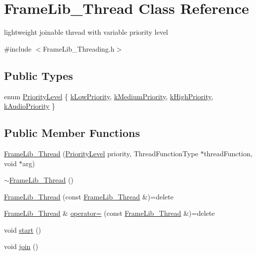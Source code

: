 \hypertarget{class_frame_lib___thread}{}\section{Frame\+Lib\+\_\+\+Thread Class Reference}
\label{class_frame_lib___thread}


lightweight joinable thread with variable priority level  




{\ttfamily \#include $<$Frame\+Lib\+\_\+\+Threading.\+h$>$}

\subsection*{Public Types}
\begin{DoxyCompactItemize}
\item 
enum \hyperlink{class_frame_lib___thread_a99a5e56edcadf37e3388f5557e8ec7ed}{Priority\+Level} \{ \hyperlink{class_frame_lib___thread_a99a5e56edcadf37e3388f5557e8ec7eda1a88fab67841ce6becd6f20038414626}{k\+Low\+Priority}, 
\hyperlink{class_frame_lib___thread_a99a5e56edcadf37e3388f5557e8ec7eda2636ca3f19213ed53440fb07a1b74fda}{k\+Medium\+Priority}, 
\hyperlink{class_frame_lib___thread_a99a5e56edcadf37e3388f5557e8ec7eda0094300f409c6599b652d503f8a66d77}{k\+High\+Priority}, 
\hyperlink{class_frame_lib___thread_a99a5e56edcadf37e3388f5557e8ec7edab5c5b4bbe028d4f9d4d605d79fb97895}{k\+Audio\+Priority}
 \}
\end{DoxyCompactItemize}
\subsection*{Public Member Functions}
\begin{DoxyCompactItemize}
\item 
\hyperlink{class_frame_lib___thread_a021c5dfa5ac08a22020680bd57ba575d}{Frame\+Lib\+\_\+\+Thread} (\hyperlink{class_frame_lib___thread_a99a5e56edcadf37e3388f5557e8ec7ed}{Priority\+Level} priority, Thread\+Function\+Type $\ast$thread\+Function, void $\ast$arg)
\item 
\hyperlink{class_frame_lib___thread_a3131c05e77de52925145496a8a7d0bb1}{$\sim$\+Frame\+Lib\+\_\+\+Thread} ()
\item 
\hyperlink{class_frame_lib___thread_a0c371ea3c0cf803ffc568fcb28d0a41a}{Frame\+Lib\+\_\+\+Thread} (const \hyperlink{class_frame_lib___thread}{Frame\+Lib\+\_\+\+Thread} \&)=delete
\item 
\hyperlink{class_frame_lib___thread}{Frame\+Lib\+\_\+\+Thread} \& \hyperlink{class_frame_lib___thread_af6a6b8a2ae2b38eb9629871ef3c40e01}{operator=} (const \hyperlink{class_frame_lib___thread}{Frame\+Lib\+\_\+\+Thread} \&)=delete
\item 
void \hyperlink{class_frame_lib___thread_a5b6dbb96372355e02fb81753638b6102}{start} ()
\item 
void \hyperlink{class_frame_lib___thread_ac316111ade61b8b4aea13d7a3f8d21a3}{join} ()
\end{DoxyCompactItemize}


